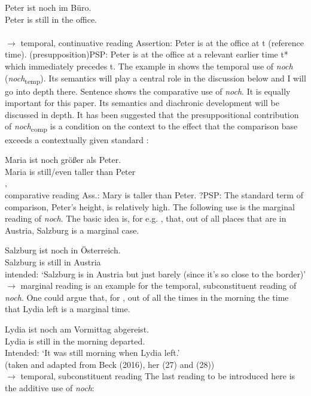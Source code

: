 \documentclass[output=paper,
modfonts
]{langscibook}
\begin{document}
\ea\gll Peter ist noch im Büro.\\
        Peter is still {in the} office.\\
\\ \hfill $\rightarrow$ temporal, continuative reading \label{NOCH_TEMP_cont_EXP}
\z
\ea\ea Assertion: Peter is at the office at t (reference time).
\ex      (presupposition)PSP: Peter is at the office at a relevant earlier time t* which immediately precedes t.
\z\z
The example in  shows the temporal use of \textit{noch} (\textit{noch}\textsubscript{temp}). Its semantics will play a central role in the discussion below and I will go into depth there. Sentence  shows the comparative use of \textit{noch}. It is equally important for this paper. Its semantics and diachronic development will be discussed in depth. It has been suggested that the presuppositional contribution of \textit{noch}\textsubscript{comp} is a condition on the context to the effect that the comparison base exceeds a contextually given standard \citep[e.g.][]{Hofstetter2013}:

\ea\gll Maria ist noch größer als Peter.\\
       Maria is still/even taller than Peter\\
, \\ \hfill comparative reading \label{NOCH_COMP_EXP_0}
\z
\ea\ea Ass.: Mary is taller than Peter.
\ex    ?PSP: The standard term of comparison, Peter's height, is relatively high.
\z\z
The following use is the marginal reading of \textit{noch}. The basic idea is, for e.g. , that, out of all places that are in Austria, Salzburg is a marginal case.

\ea\gll Salzburg ist noch in Österreich.\\
       Salzburg is still in Austria \\
\glt   intended: {`Salzburg is in Austria but just barely (since it's so close to the border)'} \\ \hfill $\rightarrow$ marginal reading \label{NOCH_MARG_deg_EXP}
\z
{} is an example for the temporal, subconstituent reading of \textit{noch}. One could argue that, for , out of all the times in the morning the time that Lydia left is a marginal time.

\ea\gll Lydia ist noch am Vormittag abgereist.\\
       Lydia is still {in the} morning departed.\\
\glt   Intended: {`It was still morning when Lydia left.'}\\ \hfill \small{(taken and adapted from Beck (2016), her (27) and (28))}\\ \normalsize \hfill $\rightarrow$ temporal, subconstituent reading \label{NOCH_TEMP_subconst_EXP}
\z
The last reading to be introduced here is the additive use of \textit{noch}:
\end{document}
